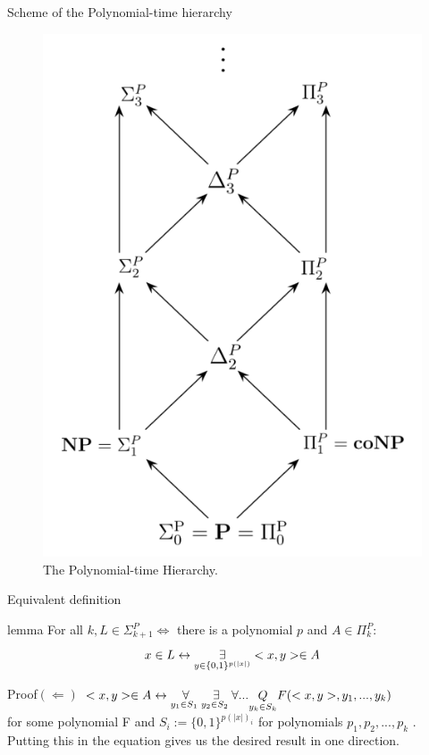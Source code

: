         \begin{frame}{Scheme of the Polynomial-time hierarchy}            
            \begin{figure}
                \centering
                \includegraphics[scale=.4]{images/PH.png}
                \caption{The Polynomial-time Hierarchy.}
                \label{fig:The Polynomial-time Hierarchy}
            \end{figure}
        \end{frame}

        \begin{frame}{Equivalent definition}
            \begin{block}{lemma}
                For all $k, L \in  \Sigma_{k+1}^P \iff $
                there is a polynomial $p$ and $A \in \Pi_k^P$:
                $$x \in L \leftrightarrow 
                \overset{{}}{\underset{{y\in \{0,1\}^{p(|x|)}}}{\Large \exists}} <x,y> \in A$$
            \end{block}
            \pause
            \begin{block}{Proof$(\Leftarrow)$}
                $<x,y> \in A \leftrightarrow \overset{{}}{\underset{{y_1 \in S_1\text{ }}}{\Large \forall}}
                    \overset{{}}{\underset{{y_2 \in S_2\text{ }}}{\Large \exists}}
                    \forall ...\underset{y_k \in S_k}{Q} F(<x,y>,y_1,...,y_k)$\\
                for some polynomial F and $S_i := \{0,1\}^{p(|x|)_i}$ for polynomials $p_1,p_2,..., p_k$
                . Putting this in the equation gives us the desired result in one direction.
            \end{block}
        \end{frame}

